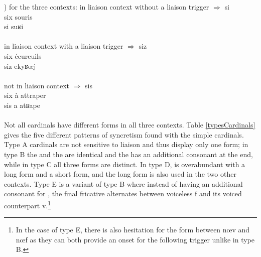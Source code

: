 \documentclass[output=paper]{langsci/langscibook}
\begin{document}
) for the three contexts:
\ea
	\ea in liaison  context without a liaison  trigger  $\Rightarrow$ si %
\lmoins\\
		\gll six souris \\ si\lmoins{ %
} suʁi %
\\ \\ 
	\ex in liaison  context with a liaison  trigger $\Rightarrow$ siz %
\lplus\\
		\gll six écureuils\\ siz\lplus{ %
} ekyʁœj %
\\ \\ 
	\ex not in liaison  context $\Rightarrow$ sis %
\lpause\\
		\gll six à attraper\\ sis\lpause{} a %
 atʁape %
\\ \\ 
	\z
\z
Not all cardinals  have different forms in all three contexts. Table \ref{typesCardinals} gives the five different patterns of syncretism found with the simple cardinals.
Type A cardinals  are not sensitive to liaison and thus display only one form; in type B the \lmoins{} and the \lpause{} are identical and the \lplus{} has an additional consonant at the end, while in type C all three forms are distinct. In type D, \lmoins{}  is overabundant with a long form and a short form, and the long form is also used in the two other contexts. Type E is a variant of type B where instead of having an additional consonant for \lplus{}, the final fricative alternates between voiceless f %
 and  its voiced counterpart v.\footnote{In the case of type E, there is also  hesitation for the \lplus{} form between nœv %
 and nœf %
 as they can both provide an onset for the following trigger unlike in type B.}
\end{document}
